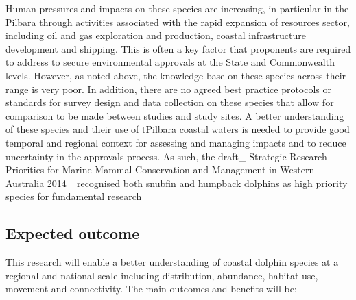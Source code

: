 \documentclass[version=last,
    paper=a4,                               %
    10pt,                                   %
    dvipsnames,
    oneside,                              %
    headings=openany,                       %
    open=any,
    BCOR=7mm,                               %
    DIV=15,     %
]{scrbook}
\begin{document}
Human pressures and impacts on these species are increasing, in
particular in the Pilbara through activities associated with the rapid
expansion of resources sector, including oil and gas exploration and
production, coastal infrastructure development and shipping. This is
often a key factor that proponents are required to address to secure
environmental approvals at the State and Commonwealth levels. However,
as noted above, the knowledge base on these species across their range
is very poor. In addition, there are no agreed best practice protocols
or standards for survey design and data collection on these species that
allow for comparison to be made between studies and study sites. A
better understanding of these species and their use of tPilbara coastal
waters is needed to provide good temporal and regional context for
assessing and managing impacts and to reduce uncertainty in the
approvals process. As such, the draft\_ Strategic Research Priorities
for Marine Mammal Conservation and Management in Western Australia
2014\_ recognised both snubfin and humpback dolphins as high priority
species for fundamental research




\subsection*{Expected outcome}

This research will enable a better understanding of coastal dolphin
species at a regional and national scale including distribution,
abundance, habitat use, movement and connectivity. The main outcomes and
benefits will be:
\end{document}
